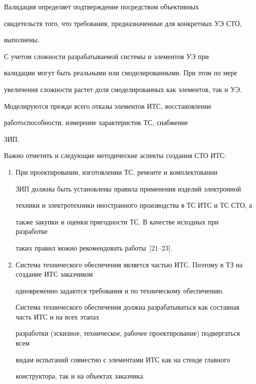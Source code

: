   


  Валидация определяет подтверждение посредством объективных 


свидетельств того, что требования, предназначенные для конкретных УЭ СТО, 


выполнены.


  


  С учетом сложности разрабатываемой системы и элементов УЭ при 


валидации могут быть реальными или смоделированными. При этом по мере 


увеличения сложности растет доля смоделированных как элементов, так и УЭ. 


Моделируются прежде всего отказы элементов ИТС, восстановление 


работоспособности, измерение характеристик ТС, снабжение 


ЗИП.





Важно отметить и следующие методические аспекты создания СТО ИТС: 


\begin{enumerate}[1.]


  \item  При проектировании, изготовлении ТС, ремонте и комплектовании 


ЗИП должны быть установлены правила применения изделий электронной 


техники и электротехники иностранного производства в ТС ИТС и ТС СТО, а 


также закупки и оценки пригодности ТС. В качестве исходных при разработке 


таких правил можно рекомендовать работы~[21--23]. 


  \item  Система технического обеспечения является частью ИТС. Поэтому в ТЗ на создание ИТС заказчиком 


одновременно задаются требования и по техническому обеспечению. 


  Система технического обеспечения должна разрабатываться как составная часть ИТС и на всех этапах 


разработки (эскизное, техническое, рабочее проектирование) подвергаться всем 


видам испытаний совместно с элементами ИТС как на стенде главного 


конструктора, так и на объектах заказчика.


\end{enumerate}






